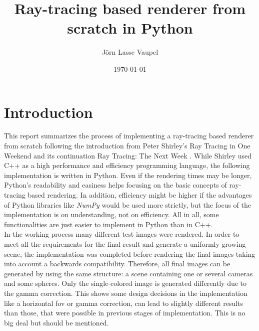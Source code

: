 \documentclass[]{article}
\title{Ray-tracing based renderer from scratch in Python}
\author{Jörn Lasse Vaupel}
\date{\today}
\begin{document}
	
	\maketitle
	\newpage
	\tableofcontents
	
	\begin{abstract}
		
	\end{abstract}

	\newpage
	
	\section{Introduction}
	\label{sec:intro}
	This report summarizes the process of implementing a ray-tracing based renderer from scratch following the introduction from Peter Shirley’s Ray Tracing in One Weekend  \cite{Shirley2020RTW1} and its continuation Ray Tracing: The Next Week \cite{Shirley2020RTW2}. While Shirley used C++ as a high performance and efficiency programming language, the following implementation is written in Python.  Even if the rendering times may be longer, Python’s readability and easiness helps focusing on the basic concepts of ray-tracing based rendering. In addition, efficiency might be higher if the advantages of Python libraries like \emph{NumPy} would be used more strictly, but the focus of the implementation is on understanding, not on efficiency. All in all, some functionalities are just easier to implement in Python than in C++.
	\\
	In the working process many different test images were rendered. In order to meet all the requirements for the final result and generate a uniformly growing scene, the implementation was completed before rendering the final images taking into account a backwards compatibility. Therefore, all final images can be generated by using the same structure: a scene containing one or several cameras and some spheres. Only the single-colored image is generated differently due to the gamma correction. This shows some design decisions in the implementation like a horizontal \ac{fov} or gamma correction, can lead to slightly different results than those, that were possible in previous stages of implementation. This is no big deal but should be mentioned.
	
\end{document}
